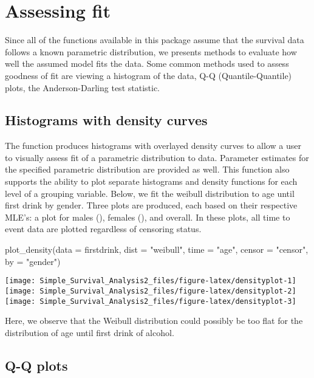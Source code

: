 \hypertarget{assessing-fit}{%
\section{Assessing fit}\label{assessing-fit}}

Since all of the functions available in this package assume that the
survival data follows a known parametric distribution, we presents
methods to evaluate how well the assumed model fits the data. Some
common methods used to assess goodness of fit are viewing a histogram of
the data, Q-Q (Quantile-Quantile) plots, the Anderson-Darling test
statistic.

\hypertarget{histograms-with-density-curves}{%
\subsection{Histograms with density
curves}\label{histograms-with-density-curves}}

The  function produces histograms with overlayed
density curves to allow a user to visually assess fit of a parametric
distribution to data. Parameter estimates for the specified parametric
distribution are provided as well. This function also supports the
ability to plot separate histograms and density functions for each level
of a grouping variable. Below, we fit the weibull distribution to age
until first drink by gender. Three plots are produced, each based on
their respective MLE's: a plot for males (), females
(), and overall. In these plots, all time to event data
are plotted regardless of censoring status.

\begin{Schunk}
\begin{Sinput}
plot_density(data = firstdrink, dist = "weibull", time = "age", censor = "censor", by = "gender")
\end{Sinput}

\texttt{[image: Simple\_Survival\_Analysis2\_files/figure-latex/densityplot-1]} 
\texttt{[image: Simple\_Survival\_Analysis2\_files/figure-latex/densityplot-2]} 
\texttt{[image: Simple\_Survival\_Analysis2\_files/figure-latex/densityplot-3]} \end{Schunk}

Here, we observe that the Weibull distribution could possibly be too
flat for the distribution of age until first drink of alcohol.

\hypertarget{q-q-plots}{%
\subsection{Q-Q plots}\label{q-q-plots}}

